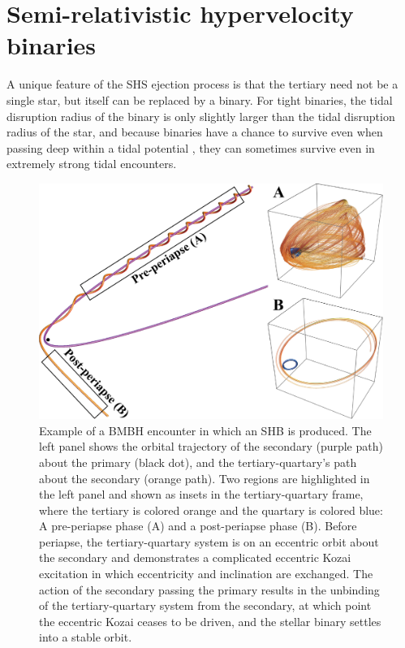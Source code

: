 \documentclass[a4paper,twocolumn]{emulateapj}
\begin{document}
{\section{Semi-relativistic hypervelocity binaries}\label{sec:shb}
A unique feature of the SHS ejection process is that the tertiary need not be a single star, but itself can be replaced by a binary. For tight binaries, the tidal disruption radius of the binary is only slightly larger than the tidal disruption radius of the star, and because binaries have a chance to survive even when passing deep within a tidal potential \citep{Sari:2010a}, they can sometimes survive even in extremely strong tidal encounters.

\begin{figure}
\centering
\includegraphics[width=0.7\linewidth,clip=true]{shb.pdf}
\caption{Example of a BMBH encounter in which an SHB is produced. The left panel shows the orbital trajectory of the secondary (purple path) about the primary (black dot), and the tertiary-quartary's path about the secondary (orange path). Two regions are highlighted in the left panel and shown as insets in the tertiary-quartary frame, where the tertiary is colored orange and the quartary is colored blue: A pre-periapse phase (A) and a post-periapse phase (B). Before periapse, the tertiary-quartary system is on an eccentric orbit about the secondary and demonstrates a complicated eccentric Kozai excitation in which eccentricity and inclination are exchanged. The action of the secondary passing the primary results in the unbinding of the tertiary-quartary system from the secondary, at which point the eccentric Kozai ceases to be driven, and the stellar binary settles into a stable orbit.}
\label{fig:shb}
\end{figure}

}
\end{document}
